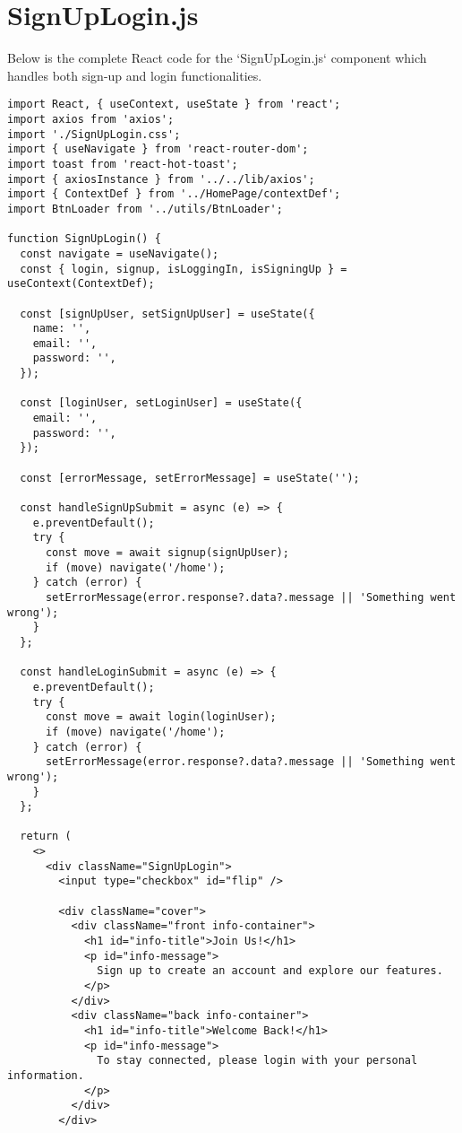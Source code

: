 \documentclass[12pt,a4paper]{report}
\begin{document}
\section{SignUpLogin.js}

Below is the complete React code for the `SignUpLogin.js` component which handles both sign-up and login functionalities.


\begin{lstlisting}
import React, { useContext, useState } from 'react';
import axios from 'axios';
import './SignUpLogin.css';
import { useNavigate } from 'react-router-dom';
import toast from 'react-hot-toast';
import { axiosInstance } from '../../lib/axios';
import { ContextDef } from '../HomePage/contextDef';
import BtnLoader from '../utils/BtnLoader';

function SignUpLogin() {
  const navigate = useNavigate();
  const { login, signup, isLoggingIn, isSigningUp } = useContext(ContextDef);

  const [signUpUser, setSignUpUser] = useState({
    name: '',
    email: '',
    password: '',
  });

  const [loginUser, setLoginUser] = useState({
    email: '',
    password: '',
  });

  const [errorMessage, setErrorMessage] = useState('');

  const handleSignUpSubmit = async (e) => {
    e.preventDefault();
    try {
      const move = await signup(signUpUser);
      if (move) navigate('/home');
    } catch (error) {
      setErrorMessage(error.response?.data?.message || 'Something went wrong');
    }
  };

  const handleLoginSubmit = async (e) => {
    e.preventDefault();
    try {
      const move = await login(loginUser);
      if (move) navigate('/home');
    } catch (error) {
      setErrorMessage(error.response?.data?.message || 'Something went wrong');
    }
  };

  return (
    <>
      <div className="SignUpLogin">
        <input type="checkbox" id="flip" />

        <div className="cover">
          <div className="front info-container">
            <h1 id="info-title">Join Us!</h1>
            <p id="info-message">
              Sign up to create an account and explore our features.
            </p>
          </div>
          <div className="back info-container">
            <h1 id="info-title">Welcome Back!</h1>
            <p id="info-message">
              To stay connected, please login with your personal information.
            </p>
          </div>
        </div>


\end{lstlisting}
\end{document}
